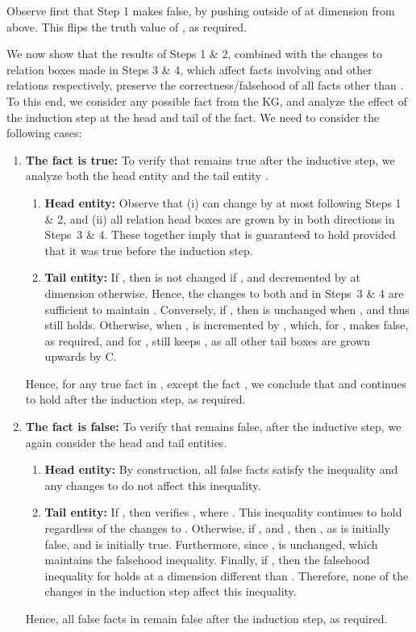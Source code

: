 \documentclass{article}
\begin{document}
Observe first that Step 1 makes  false, by pushing  outside of  at dimension  from above. This flips the truth value of , as required.



We now show that the results of Steps 1 \& 2, combined with the changes to relation boxes made in Steps 3 \& 4, which affect facts involving  and other relations respectively, preserve the correctness/falsehood of all facts other than . To this end, we consider any possible fact  from the KG, and analyze the effect of the induction step at the head and tail of the fact. We need to consider the following cases:
\begin{enumerate}[{Case} 1.]
    \item \textbf{The fact  is true:} To verify that  remains true after the inductive step, we analyze both the head entity  and the tail entity . 
    \begin{enumerate}
        \item \textbf{Head entity:} Observe that (i)  can change by at most  following Steps 1 \& 2, and 
        (ii) all relation head boxes are grown by  in both directions in Steps~3 \& 4. These together imply that  is guaranteed to hold provided that it was true before the induction step.
        \item \textbf{Tail entity:} If , then  is not changed if , and decremented by  at dimension  otherwise. Hence, the changes to both  and  in Steps~3 \& 4 are sufficient to maintain . 
        Conversely, if , then  is unchanged when , and thus  still holds. Otherwise, when ,  is incremented by , which, for , makes  false, as required, and for , still keeps , as all other tail boxes are grown upwards by C. 
    \end{enumerate}
    Hence, for any true fact in , except the fact , we conclude that  and  continues to hold after the induction step, as required. 
    \item \textbf{The fact  is false:}  To verify that  remains false, after the inductive step, we again consider the head and tail entities.
    \begin{enumerate}
        \item \textbf{Head entity:} By construction, all false facts   satisfy the inequality  
        and any changes to  do not affect this inequality.
        \item \textbf{Tail entity:} If , then  verifies , where . This inequality continues to hold regardless of the changes to . Otherwise, if , and , then , as  is initially false, and  is initially true.  Furthermore, since ,  is unchanged, which maintains the falsehood inequality. Finally, if , then the falsehood inequality for  holds at a dimension different than . Therefore, none of the changes in the induction step affect this inequality.
    \end{enumerate}
    Hence, all false facts in  remain false after the induction step, as required. 
\end{enumerate}
\end{document}
